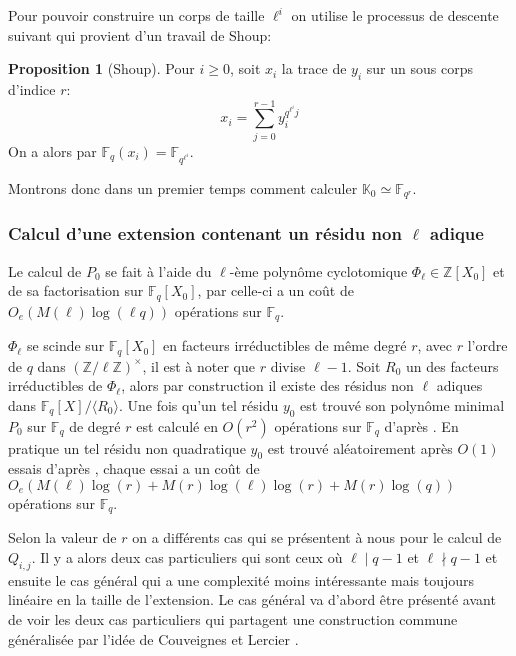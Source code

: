 \documentclass[10pt,a4paper]{book}
\theoremstyle{plain}
\theoremstyle{definition}
\theoremstyle{definition}
\theoremstyle{definition}
\newtheorem{prop}[thm]{Proposition}
\theoremstyle{definition}
\theoremstyle{remark}
\theoremstyle{remark}
\theoremstyle{definition}
\begin{document}
 Pour pouvoir construire un corps de taille $\ell^i$ on utilise le processus de descente suivant qui provient d'un  travail de Shoup:

\begin{prop}[Shoup]
Pour $i \geqslant 0$, soit $x_i$ la trace de $y_i$ sur un sous corps d'indice $r$:
\begin{equation*}
x_i=\sum_{j=0}^{r-1}y_i^{q^{\ell^i}j}
\end{equation*}
On a alors par \cite[Th. 2.1]{Shoup88} $\mathbb{F}_q(x_i)=\mathbb{F}_{q^{\ell^i}}$.
\end{prop}

Montrons donc dans un premier temps comment calculer $\mathbb{K}_0 \simeq \mathbb{F}_{q^r}$.



\subsubsection{Calcul d'une extension contenant un résidu non $\ell$ adique}
Le calcul de $P_0$ se fait à l'aide du $\ell$-ème polynôme cyclotomique $\Phi_{\ell} \in \mathbb{Z}[X_0]$ et de sa factorisation sur $\mathbb{F}_q[X_0]$, par \cite[Th.9]{Shoup93} celle-ci a un coût de $O_e(M(\ell)\log(\ell q))$ opérations sur $\mathbb{F}_q$.

$\Phi_{\ell}$ se scinde sur $\mathbb{F}_q[X_0]$ en facteurs irréductibles de même degré $r$, avec $r$ l'ordre de $q$ dans $(\mathbb{Z}/\ell \mathbb{Z})^{\times}$, il est à noter que $r$ divise $\ell-1$. Soit $R_0$ un des facteurs irréductibles de $\Phi_{\ell}$, alors par construction il existe des résidus non $\ell$ adiques dans $\mathbb{F}_q[X]/\langle R_0 \rangle$. Une fois qu'un tel résidu $y_0$ est trouvé son polynôme minimal $P_0$ sur $\mathbb{F}_q$ de degré $r$ est calculé en $O(r^2)$ opérations sur $\mathbb{F}_q$ d'après \cite[Th.4]{Shoup93}. 
En pratique un tel résidu non quadratique $y_0$ est trouvé aléatoirement après $O(1)$ essais d'après \cite[Lemma 15]{Shoup93}, chaque essai a un coût de $O_e(M(\ell)\log(r)+M(r)\log(\ell)\log(r)+M(r)\log(q))$ opérations sur $\mathbb{F}_q$.

Selon la valeur de $r$ on a différents cas qui se présentent à nous pour le calcul de $Q_{i,j}$. Il y a alors deux cas particuliers qui sont ceux où $\ell \mid q-1$ et $\ell \nmid q-1$ et ensuite le cas général qui a une complexité moins intéressante mais toujours linéaire en la taille de l'extension. Le cas général va d'abord être présenté avant de voir les deux cas particuliers qui partagent une construction commune généralisée par l'idée de Couveignes et Lercier \cite{couveignesLercier2013}.
\end{document}
